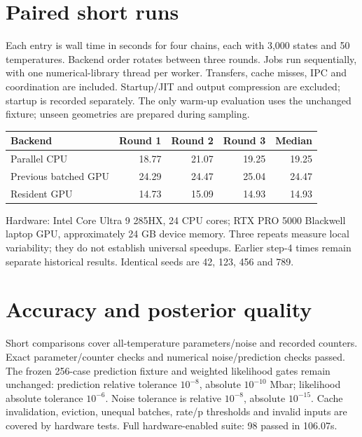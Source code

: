 \documentclass[11pt]{article}
\begin{document}
\section*{Paired short runs}
Each entry is wall time in seconds for four chains, each with 3,000 states and
50 temperatures. Backend order rotates between three rounds. Jobs run sequentially,
with one numerical-library thread per worker. Transfers, cache misses, IPC and
coordination are included. Startup/JIT and output compression are excluded;
startup is recorded separately. The only warm-up evaluation uses the unchanged
fixture; unseen geometries are prepared during sampling.
\begin{center}\begin{tabular}{lrrrr}\toprule
Backend & Round 1 & Round 2 & Round 3 & Median\\\midrule
Parallel CPU & 18.77 & 21.07 & 19.25 & 19.25\\
Previous batched GPU & 24.29 & 24.47 & 25.04 & 24.47\\
Resident GPU & 14.73 & 15.09 & 14.93 & 14.93\\
\bottomrule\end{tabular}\end{center}
Hardware: Intel Core Ultra 9 285HX, 24 CPU cores; RTX PRO 5000 Blackwell laptop
GPU, approximately 24 GB device memory. Three repeats measure local variability;
they do not establish universal speedups. Earlier step-4 times remain separate
historical results. Identical seeds are 42, 123, 456 and 789.
\section*{Accuracy and posterior quality}
Short comparisons cover all-temperature parameters/noise and recorded counters.
Exact parameter/counter checks and numerical noise/prediction checks passed.
The frozen 256-case prediction fixture and weighted likelihood gates remain
unchanged: prediction relative tolerance $10^{-8}$, absolute $10^{-10}$ Mbar;
likelihood absolute tolerance $10^{-6}$. Noise tolerance is relative $10^{-8}$,
absolute $10^{-15}$. Cache invalidation, eviction, unequal batches, rate/p
thresholds and invalid inputs are covered by hardware tests. Full hardware-enabled suite:
98 passed in 106.07s.
\end{document}
